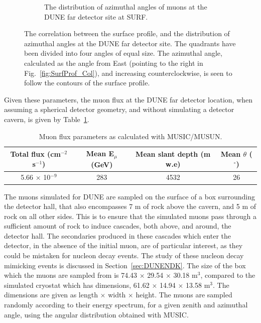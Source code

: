\begin{figure}[h!]
\begin{subfigure}{0.45\textwidth}
    \caption{The distribution of azimuthal angles of muons at the DUNE far detector site at SURF.}
    \label{fig:SurfProf_Azi}
  \end{subfigure}
  \caption[The correlation between the surface profile, and the distribution of azimuthal angles at the DUNE far detector site]
          {The correlation between the surface profile, and the distribution of azimuthal angles at the DUNE far detector site. The quadrants have been divided into four angles of equal size. The azimuthal angle, calculated as the angle from East (pointing to the right in Fig.~\ref{fig:SurfProf_Col}), and increasing counterclockwise, is seen to follow the contours of the surface profile.}
\end{figure}

Given these parameters, the muon flux at the DUNE far detector location, when assuming a spherical detector geometry, and without simulating a detector cavern, is given by Table~\ref{tab:MUSUNflux}. \\
\begin{table}[h!]
  \caption[Muon flux parameters as calculated with MUSIC/MUSUN.]
          {Muon flux parameters as calculated with MUSIC/MUSUN.}
  \centering
  \label{tab:MUSUNflux}
  \begin{tabular}{c c c c}
    \toprule
        {Total flux (cm$^{-2}$ s$^{-1}$)} & {Mean E$_{\mu}$ (GeV)} & {Mean slant depth (m w.e)} & {Mean $\theta$ ($^{\circ}$)} \\ 
        \midrule
        5.66 $\times$ 10$^{-9}$           & 283                    & 4532                       & 26                           \\
    \bottomrule
  \end{tabular}
\end{table}

The muons simulated for DUNE are sampled on the surface of a box surrounding the detector hall, that also encompasses 7 m of rock above the cavern, and 5 m of rock on all other sides. This is to ensure that the simulated muons pass through a sufficient amount of rock to induce cascades, both above, and around, the detector hall. The secondaries produced in these cascades which enter the detector, in the absence of the initial muon, are of particular interest, as they could be mistaken for nucleon decay events. The study of these nucleon decay mimicking events is discussed in Section~\ref{sec:DUNENDK}. The size of the box which the muons are sampled from is 74.43 $\times$ 29.54 $\times$ 30.18 m$^3$, compared to the simulated cryostat which has dimensions, 61.62 $\times$ 14.94 $\times$ 13.58 m$^3$. The dimensions are given as length $\times$ width $\times$ height. The muons are sampled randomly according to their energy spectrum, for a given zenith and azimuthal angle, using the angular distribution obtained with MUSIC. \\

